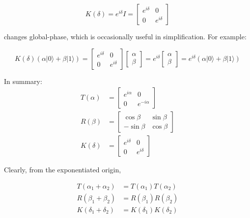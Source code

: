 \documentclass[main.tex]{subfiles}
\begin{document}
    $$
    K(\delta)=e^{i \delta} I=\left[\begin{array}{cc}
    e^{i \delta} & 0 \\
    0 & e^{i \delta}
    \end{array}\right]
    $$
    
    changes global-phase, which is occasionally useful in simplification. For example:
    
    $$
    K(\delta)(\alpha|0\rangle+\beta|1\rangle)=\left[\begin{array}{cc}
    e^{i \delta} & 0 \\
    0 & e^{i \delta}
    \end{array}\right]\left[\begin{array}{c}
    \alpha \\
    \beta
    \end{array}\right]=e^{i \delta}\left[\begin{array}{l}
    \alpha \\
    \beta
    \end{array}\right]=e^{i \delta}(\alpha|0\rangle+\beta|1\rangle)
    $$
    
    In summary:
    $$
    \begin{aligned}
    T(\alpha) &=\left[\begin{array}{cc}
    e^{i \alpha} & 0 \\
    0 & e^{-i \alpha}
    \end{array}\right] \\
    R(\beta) &=\left[\begin{array}{cc}
    \cos \beta & \sin \beta \\
    -\sin \beta & \cos \beta
    \end{array}\right] \\
    K(\delta) &=\left[\begin{array}{cc}
    e^{i \delta} & 0 \\
    0 & e^{i \delta}
    \end{array}\right]
    \end{aligned}
    $$
    
    Clearly, from the exponentiated origin,
    
    $$
    \begin{aligned}
    T\left(\alpha_{1}+\alpha_{2}\right) &=T\left(\alpha_{1}\right) T\left(\alpha_{2}\right) \\
    R\left(\beta_{1}+\beta_{2}\right) &=R\left(\beta_{1}\right) R\left(\beta_{2}\right) \\
    K\left(\delta_{1}+\delta_{2}\right) &=K\left(\delta_{1}\right) K\left(\delta_{2}\right)
    \end{aligned}
    $$
    
\end{document}
